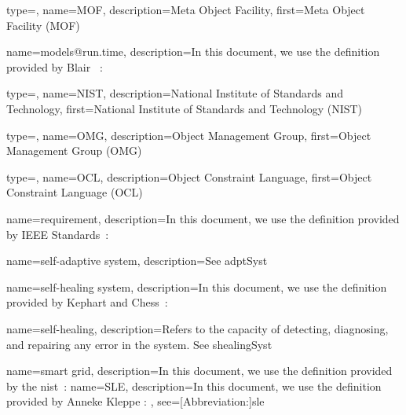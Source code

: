 {
	type=\acronymtype, 
	name={MOF},
	description={Meta Object Facility},
	first={Meta Object Facility (MOF)}
}

{
	name={models@run.time},
	description={In this document, we use the definition provided by Blair \etal~\cite{DBLP:journals/computer/BlairBF09}: }
}

{
	type=\acronymtype,
	name={NIST},
	description={National Institute of Standards and Technology},
	first={National Institute of Standards and Technology (NIST)}
}

{
	type=\acronymtype,
	name={OMG},
	description={Object Management Group},
	first={Object Management Group (OMG)}
}

{
	type=\acronymtype,
	name={OCL},
	description={Object Constraint Language},
	first={Object Constraint Language (OCL)}
}


{
	name={requirement},
	description={In this document, we use the definition provided by IEEE Standards~\cite{iso2017systems}: }
}

{
	name={self-adaptive system},
	description={See \gls{adptSyst}}
}

{
	name={self-healing system},
	description={In this document, we use the definition provided by Kephart and Chess~\cite{DBLP:journals/computer/KephartC03}: }
}

{
	name={self-healing},
	description={Refers to the capacity of detecting, diagnosing, and repairing any error in the system. See \gls{shealingSyst}}
}

{
	name={smart grid},
	description={In this document, we use the definition provided by the \gls{nist}~\cite{NIST:SmartGrid:Def:What}: }
}
{
	name={SLE},
 	description={In this document, we use the definition provided by Anneke Kleppe \cite{kleppe2008software}: },
 	see=[Abbreviation:]{sle}
}

